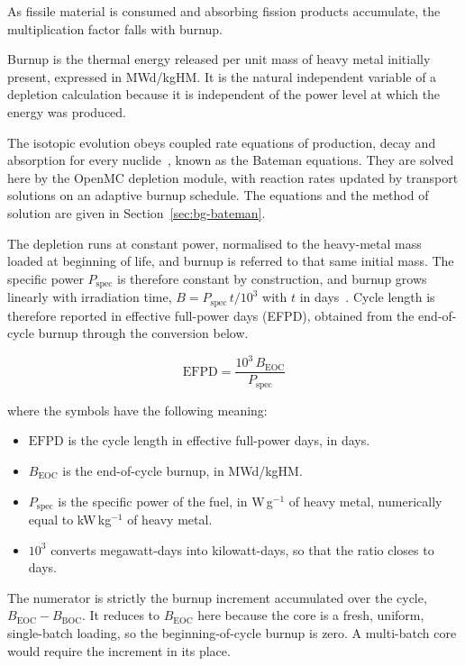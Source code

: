 As fissile material is consumed and absorbing fission products
accumulate, the multiplication factor falls with burnup.

Burnup is the thermal energy released per unit mass of heavy metal
initially present, expressed in MWd/kgHM. It is the natural independent
variable of a depletion calculation because it is independent of the
power level at which the energy was produced.

The isotopic evolution obeys coupled rate equations of production,
decay and absorption for every nuclide~\cite{duderstadt_hamilton_1976},
known as the Bateman equations. They are solved here by the OpenMC
depletion module, with reaction rates updated by transport solutions on
an adaptive burnup schedule. The equations and the method of solution
are given in Section~\ref{sec:bg-bateman}.

The depletion runs at constant power, normalised to the heavy-metal
mass loaded at beginning of life, and burnup is referred to that same
initial mass. The specific power $P_\mathrm{spec}$ is therefore constant
by construction, and burnup grows linearly with irradiation time,
$B = P_\mathrm{spec}\,t/10^{3}$ with $t$ in days~\cite{lee_2020}.
Cycle length is
therefore reported in effective full-power days (EFPD), obtained from
the end-of-cycle burnup through the conversion below.

\begin{equation}
\mathrm{EFPD} = \frac{10^{3}\,B_\mathrm{EOC}}{P_\mathrm{spec}}
\label{eq:efpd}
\end{equation}

\noindent where the symbols have the following meaning:

\begin{itemize}
  \item $\mathrm{EFPD}$ is the cycle length in effective full-power
        days, in days.

  \item $B_\mathrm{EOC}$ is the end-of-cycle burnup, in MWd/kgHM.

  \item $P_\mathrm{spec}$ is the specific power of the fuel, in
        W\,g$^{-1}$ of heavy metal, numerically equal to
        kW\,kg$^{-1}$ of heavy metal.

  \item $10^{3}$ converts megawatt-days into kilowatt-days, so that the
        ratio closes to days.
\end{itemize}

The numerator is strictly the burnup increment accumulated over the
cycle, $B_\mathrm{EOC} - B_\mathrm{BOC}$. It reduces to
$B_\mathrm{EOC}$ here because the core is a fresh, uniform,
single-batch loading, so the beginning-of-cycle burnup is zero. A
multi-batch core would require the increment in its place.

